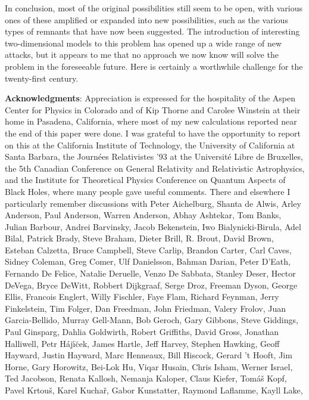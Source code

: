 	In conclusion, most of the original possibilities
\cite{Pag80} still seem to
be open, with various ones of these amplified or expanded into new
possibilities, such as the various types of remnants that have now
been
suggested.  The introduction of interesting two-dimensional models to
this
problem \cite{CGHS} has opened up a wide range of new attacks, but it
appears
to me that no approach we now know will solve the problem in the
foreseeable
future.  Here is certainly a worthwhile challenge for the
twenty-first century.

\pagebreak
\baselineskip 14.6pt
	{\bf Acknowledgments}:  Appreciation is expressed for the
hospitality of the Aspen Center for Physics in Colorado and of Kip
Thorne and Carolee Winstein at their home in Pasadena, California,
where most of my new calculations reported near the end of this paper
were done.  I was grateful to have the opportunity to report on this
at the California Institute of Technology, the University of
California at Santa Barbara, the Journ\'{e}es Relativistes '93 at the
Universit\'{e} Libre de Bruxelles, the 5th Canadian Conference on
General Relativity and Relativistic Astrophysics, and the Institute
for Theoretical Physics Conference on Quantum Aspects of Black Holes,
where many people gave useful comments.
There and elsewhere I particularly remember discussions with
Peter Aichelburg, Shanta de Alwis, Arley Anderson, Paul Anderson,
Warren Anderson, Abhay Ashtekar, Tom Banks, Julian Barbour,
Andrei Barvinsky, Jacob Bekenstein, Iwo Bialynicki-Birula, Adel
Bilal,
Patrick Brady, Steve Braham, Dieter Brill, R. Brout, David Brown,
Esteban Calzetta, Bruce Campbell, Steve Carlip, Brandon Carter,
Carl Caves, Sidney Coleman, Greg Comer, Ulf Danielsson,
Bahman Darian, Peter D'Eath, Fernando De Felice,
Natalie Deruelle, Venzo De Sabbata, Stanley Deser,
Hector DeVega, Bryce DeWitt, Robbert Dijkgraaf,
Serge Droz, Freeman Dyson, George Ellis, Francois Englert,
Willy Fischler, Faye Flam, Richard Feynman, Jerry Finkelstein,
Tim Folger, Dan Freedman, John Friedman, Valery Frolov,
Juan Garcia-Bellido, Murray Gell-Mann, Bob Geroch,
Gary Gibbons, Steve Giddings, Paul Ginsparg,
Dahlia Goldwirth, Robert Griffiths, David Gross,
Jonathan Halliwell, Petr H\'{a}j\'{\i}\u{c}ek, James Hartle,
Jeff Harvey, Stephen Hawking, Geoff Hayward, Justin Hayward,
Marc Henneaux, Bill Hiscock, Gerard 't Hooft, Jim Horne,
Gary Horowitz, Bei-Lok Hu, Viqar Husain, Chris Isham,
Werner Israel, Ted Jacobson, Renata Kallosh, Nemanja Kaloper,
Claus Kiefer, Tom\'{a}\v{s} Kopf, Pavel Krtou\v{s}, Karel Kucha\v{r},
Gabor Kunstatter, Raymond Laflamme, Kayll Lake,
